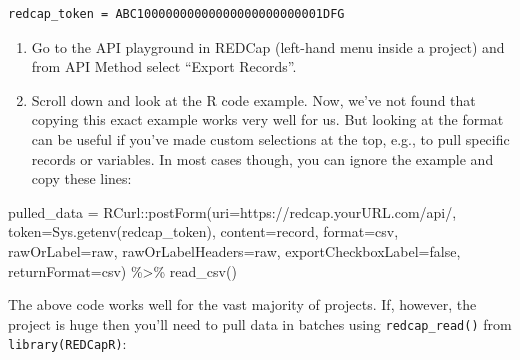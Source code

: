 \documentclass[
]{book}
\newenvironment{Shaded}{\begin{snugshade}}{\end{snugshade}}
\newcommand{\AttributeTok}[1]{\textcolor[rgb]{0.77,0.63,0.00}{#1}}
\newcommand{\FunctionTok}[1]{\textcolor[rgb]{0.00,0.00,0.00}{#1}}
\newcommand{\NormalTok}[1]{#1}
\newcommand{\OtherTok}[1]{\textcolor[rgb]{0.56,0.35,0.01}{#1}}
\newcommand{\SpecialCharTok}[1]{\textcolor[rgb]{0.00,0.00,0.00}{#1}}
\newcommand{\StringTok}[1]{\textcolor[rgb]{0.31,0.60,0.02}{#1}}
\begin{document}
\begin{verbatim}
redcap_token = ABC10000000000000000000000001DFG
\end{verbatim}

\begin{enumerate}
\def\labelenumi{\arabic{enumi}.}
\setcounter{enumi}{2}
\item
  Go to the API playground in REDCap (left-hand menu inside a project) and from API Method select ``Export Records''.
\item
  Scroll down and look at the R code example. Now, we've not found that copying this exact example works very well for us. But looking at the format can be useful if you've made custom selections at the top, e.g., to pull specific records or variables. In most cases though, you can ignore the example and copy these lines:
\end{enumerate}

\begin{Shaded}
\begin{Highlighting}[]
\NormalTok{pulled\_data }\OtherTok{=}\NormalTok{ RCurl}\SpecialCharTok{::}\FunctionTok{postForm}\NormalTok{(}\AttributeTok{uri=}\StringTok{\textquotesingle{}https://redcap.yourURL.com/api/\textquotesingle{}}\NormalTok{,}
                        \AttributeTok{token=}\FunctionTok{Sys.getenv}\NormalTok{(redcap\_token),}
                        \AttributeTok{content=}\StringTok{\textquotesingle{}record\textquotesingle{}}\NormalTok{,}
                        \AttributeTok{format=}\StringTok{\textquotesingle{}csv\textquotesingle{}}\NormalTok{,}
                        \AttributeTok{rawOrLabel=}\StringTok{\textquotesingle{}raw\textquotesingle{}}\NormalTok{,}
                        \AttributeTok{rawOrLabelHeaders=}\StringTok{\textquotesingle{}raw\textquotesingle{}}\NormalTok{,}
                        \AttributeTok{exportCheckboxLabel=}\StringTok{\textquotesingle{}false\textquotesingle{}}\NormalTok{,}
                        \AttributeTok{returnFormat=}\StringTok{\textquotesingle{}csv\textquotesingle{}}\NormalTok{) }\SpecialCharTok{\%\textgreater{}\%} 
    \FunctionTok{read\_csv}\NormalTok{()}
\end{Highlighting}
\end{Shaded}

The above code works well for the vast majority of projects. If, however, the project is huge then you'll need to pull data in batches using \texttt{redcap\_read()} from \texttt{library(REDCapR)}:
\end{document}
